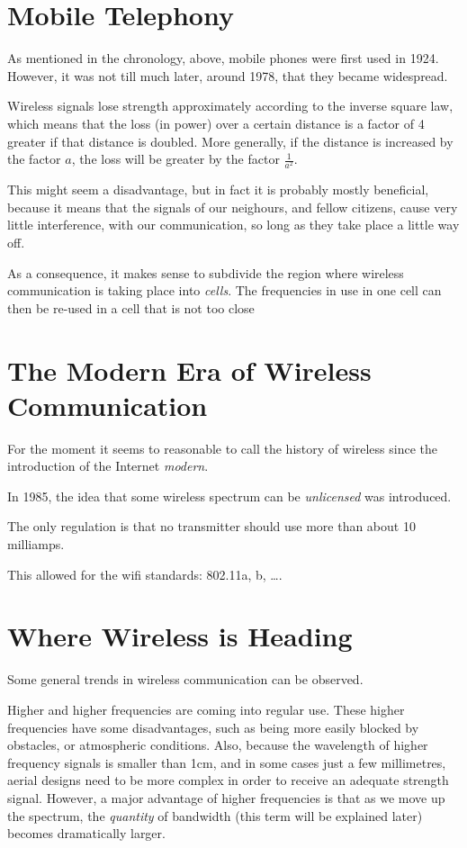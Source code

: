 \section{Mobile Telephony}

As mentioned in the chronology, above, mobile phones were first used in 1924. However,
it was not till much later, around 1978, that they became widespread. 

Wireless signals lose strength approximately according to the inverse square law,
which means that the loss (in power) over a certain distance is a factor of 4 greater
if that distance is doubled. More generally, if the distance is increased by the factor
$a$, the loss will be greater by the factor $\frac{1}{ a^2}$. 

This might seem a disadvantage, but in fact it is probably mostly beneficial, because it 
means that the signals of our neighours, and fellow citizens, cause very little interference,
with our communication, so long as they take place a little way off.

As a consequence, it makes sense to subdivide the region where wireless communication is taking
place into {\em cells}. The frequencies in use in one cell can then be re-used in a cell that
is not too close

\section{The Modern Era of Wireless Communication}

For the moment it seems to reasonable to call the history of wireless since the introduction 
of the Internet {\em modern}.

In 1985, the idea that some wireless spectrum can be {\em unlicensed} was introduced.

The only regulation is that no transmitter should use more than about 10 milliamps.

This allowed for the wifi standards: 802.11a, b, \dots.

\section{Where Wireless is Heading}

Some general trends in wireless communication can be observed. 

Higher and higher frequencies are coming into regular use. These higher frequencies have some disadvantages, such
as being more easily blocked by obstacles, or atmospheric conditions. Also, because the wavelength
of higher frequency signals is smaller than 1cm, and in some cases just a few millimetres, aerial designs need
to be more complex in order to receive an adequate strength signal. However, a major advantage of higher frequencies
is that as we move up the spectrum, the {\em quantity} of bandwidth (this term will be explained later) becomes
dramatically larger.
